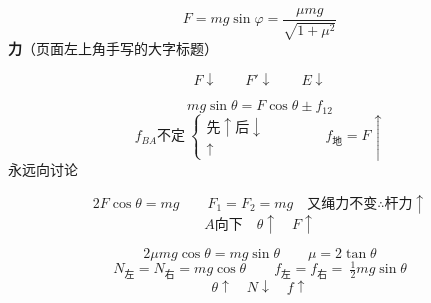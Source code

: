 \[
F=mg\sin\varphi=\frac{\mu mg}{\sqrt{1+\mu^2}}
\]
\textbf{力}\quad（页面左上角手写的大字标题）
\begin{problem}
\begin{solution}
\[ F\downarrow\qquad F'\downarrow\qquad E\downarrow \] %
\end{solution}
\end{problem}
\begin{problem}
\begin{solution}
\[ mg\sin\theta=F\cos\theta\pm f_{12} \]
\[ f_{BA}\text{不定}\ \begin{cases}\text{先}\uparrow\text{后}\downarrow\\ \uparrow\end{cases}\qquad\qquad f_{\text{地}}=F\uparrow \]
永远向讨论 %
\end{solution}
\end{problem}
\begin{problem}
\begin{solution}
\[ 2F\cos\theta=mg\qquad F_1=F_2=mg\quad\text{又绳力不变}\therefore\text{杆力}\uparrow \] %
\[ A\text{向下}\quad\theta\uparrow\quad F\uparrow \]
\end{solution}
\end{problem}
\begin{problem}
\begin{solution}
\[ 2\mu mg\cos\theta=mg\sin\theta\qquad \mu=2\tan\theta \] %
\[ N_{\text{左}}=N_{\text{右}}=mg\cos\theta\qquad f_{\text{左}}=f_{\text{右}}=\ \tfrac12 mg\sin\theta \] %
\[ \theta\uparrow\quad N\downarrow\quad f\uparrow \]
\end{solution}
\end{problem}
